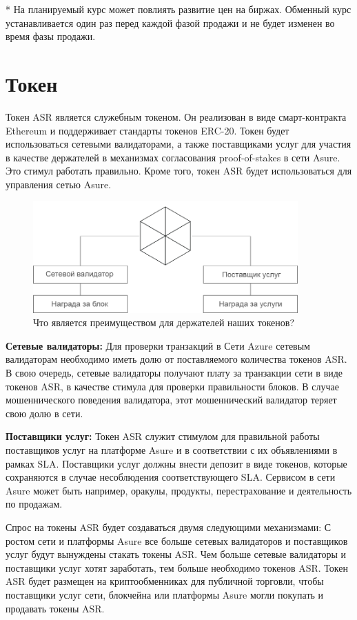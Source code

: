 * На планируемый курс может повлиять развитие цен на биржах. Обменный курс устанавливается один раз перед каждой фазой продажи и не будет изменен во время фазы продажи.

\section{Токен}

Токен ASR является служебным токеном. Он реализован в виде смарт-контракта Ethereum и поддерживает стандарты токенов ERC-20. Токен будет использоваться сетевыми валидаторами, а также поставщиками услуг для участия в качестве держателей в механизмах согласования proof-of-stakes в сети Asure. Это стимул работать правильно. Кроме того, токен ASR будет использоваться для управления сетью Asure.

\begin{figure}[H]
    \centering
    \includegraphics[width=4.0in]{img/staking.png}
    \caption{Что является преимуществом для держателей наших токенов?}
    \label{fig:asure_architecture}
\end{figure}

\textbf{Сетевые валидаторы:}
Для проверки транзакций в Сети Azure сетевым валидаторам необходимо иметь долю от поставляемого количества токенов ASR. В свою очередь, сетевые валидаторы получают плату за транзакции сети в виде токенов ASR, в качестве стимула для проверки правильности блоков. В случае мошеннического поведения валидатора, этот мошеннический валидатор теряет свою долю в сети.\newline

\textbf{Поставщики услуг:}
Токен ASR служит стимулом для правильной работы поставщиков услуг на платформе Asure и в соответствии с их объявлениями в рамках SLA. Поставщики услуг должны внести депозит в виде токенов, которые сохраняются в случае несоблюдения соответствующего SLA. Сервисом в сети Asure может быть например, оракулы, продукты, перестрахование и деятельность по продажам.\newline

Спрос на токены ASR будет создаваться двумя следующими механизмами: С ростом сети и платформы Asure все больше сетевых валидаторов и поставщиков услуг будут вынуждены стакать токены ASR. Чем больше сетевые валидаторы и поставщики услуг хотят заработать, тем больше необходимо токенов ASR.\newline
Токен ASR будет размещен на криптообменниках для публичной торговли, чтобы поставщики услуг сети, блокчейна или платформы Asure могли покупать и продавать токены ASR.\newline

